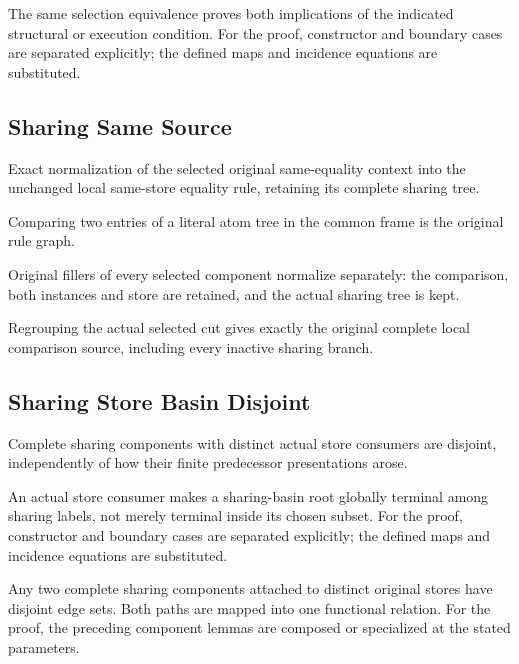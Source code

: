 The same selection equivalence proves both implications of the indicated structural or execution condition.
For the proof, constructor and boundary cases are separated explicitly; the defined maps and incidence equations are substituted.
\par{}

\subsection{Sharing Same Source}
Exact normalization of the selected original same-equality context into the unchanged local same-store equality rule, retaining its complete sharing tree.

Comparing two entries of a literal atom tree in the common frame is the original rule graph.
\par{}

Original fillers of every selected component normalize separately: the comparison, both instances and store are retained, and the actual sharing tree is kept.
\par{}

Regrouping the actual selected cut gives exactly the original complete local comparison source, including every inactive sharing branch.
\par{}

\subsection{Sharing Store Basin Disjoint}
Complete sharing components with distinct actual store consumers are disjoint, independently of how their finite predecessor presentations arose.

An actual store consumer makes a sharing-basin root globally terminal among sharing labels, not merely terminal inside its chosen subset.
For the proof, constructor and boundary cases are separated explicitly; the defined maps and incidence equations are substituted.
\par{}

Any two complete sharing components attached to distinct original stores have disjoint edge sets. Both paths are mapped into one functional relation.
For the proof, the preceding component lemmas are composed or specialized at the stated parameters.
\par{}

